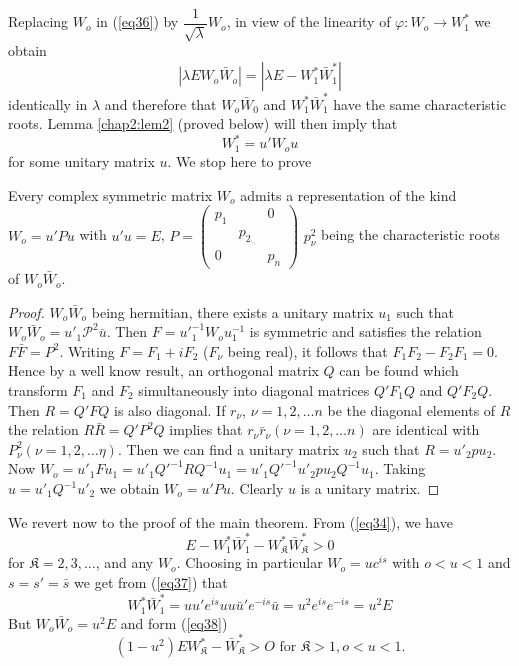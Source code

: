Replacing $W_o$ in (\ref{eq36}) by $\dfrac{1}{\sqrt{\lambda}} W_o$, in view
of the linearity of $\varphi: W_o \to W^*_1$ we obtain 
$$
|\lambda E W_o \bar{W}_o| = |\lambda E - W^*_1 \bar{W}^*_1 | 
$$
identically in $\lambda$ and therefore that $W_o \bar{W}_0$ and $W_1^*
\bar{W}^*_1$ have the same characteristic roots. Lemma \ref{chap2:lem2} (proved
below) will then imply that  
\begin{equation*}
W^*_1 = u' W_o u \tag{37}\label{eq37}  
 \end{equation*} 
 for some unitary matrix $u$. We stop here to prove

\setcounter{lem}{1}
 \begin{lem}\label{chap2:lem2} %
Every complex symmetric matrix $W_o$ admits a representation of
  the kind $W_o = u' P u$ with $u'u = E$, $P =\begin{pmatrix}
  p_1 & &  0 \\ & p_{2_{\ddots}}  & \\ 0 & &
   p_n\end{pmatrix}$  $p_\nu ^2$  being the
    characteristic roots of $W_o \bar{W}_o$. 
 \end{lem} 

 \begin{proof}
 $W_o \bar{W}_o$ being hermitian, there exists a unitary matrix $u_1$
   such that $W_o \bar{W}_o = u'_1 \mathcal{P}^2 \bar{u}$. Then $F =
   u'^{-1}_1 W_o u^{-1}_1$ is symmetric and satisfies the relation $F
   \bar{F} = P^2$. Writing $F =F_1 + iF_2$ ($F_\nu$ being real), it
   follows that $F_1 F_2 - F_2 F_1 = 0$. Hence  by a well know result,
   an orthogonal matrix $Q$ can be found which transform $F_1$ and
   $F_2$ simultaneously into diagonal matrices $Q' F_1 Q$ and $Q' F_2
   Q$. Then $R = Q' F Q$ is also diagonal. If $r_\nu$, $\nu = 1,2, \dots
   n$ be the diagonal elements of $R$ the relation $R \bar{R}= Q' P^2
   Q$ implies that $r_\nu \bar{r}_\nu (\nu =1,2, \dots n)$ are identical
   with $P^2_\nu (\nu = 1,2,\dots \eta)$. Then we can find a unitary
   matrix $u_2$ such that $R=u'_2 p u_2$. Now $W_o = u'_1 F u_1 = u'_1
   Q'^{-1} R Q^{-1} u_1 = u'_1 Q'^{-1} u'_2 p u_2 Q^{-1}
   u_1$. Taking\pageoriginale    $u =u'_1 Q^{-1} u'_2$ we obtain $W_o
   = u' P u$. Clearly $u$ is a    unitary matrix.   
 \end{proof} 
 
 We revert now to the proof of the main theorem. From (\ref{eq34}), we have
 \begin{equation*}
E - W^*_1 \bar{W}^*_1 - W^*_{\mathfrak{K}} \bar{W}^*_{\mathfrak{K}} >
0 \tag{38}\label{eq38}   
 \end{equation*}
 for $\mathfrak{K} = 2,3,\ldots$, and any $W_o$. Choosing in
 particular $W_o = u c^{is}$ with $o < u < 1$ and $s =s'= \bar{s}$ we
 get from (\ref{eq37}) that 
 \begin{equation*}
W^*_1 \bar{W}^*_1 = u u' e^{is} u u \bar{u}' e^{-is} \bar{u} = u^2
e^{is}  e^{-is} = u^2 E
\end{equation*}
But $W_o \bar{W}_o = u^2 E$ and form (\ref{eq38})
 $$
(1-u^2) E W^*_{\mathfrak{K}} - \bar{W}^*_\mathfrak{K} > O \text{ for }
 \mathfrak{K} >1, o < u < 1. 
 $$
 
